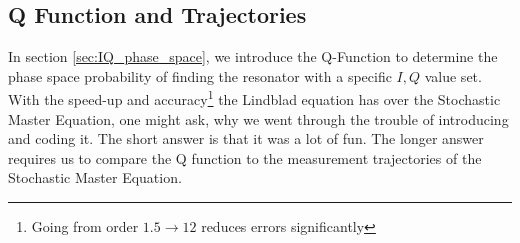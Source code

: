 

\FloatBarrier

\subsection{Q Function and Trajectories}
In section \ref{sec:IQ_phase_space}, we introduce the Q-Function to determine the phase space probability of finding the resonator with a specific $I, Q$ value set. With the speed-up and accuracy\footnote{Going from order $1.5 \rightarrow 12$ reduces errors significantly} the Lindblad equation has over the Stochastic Master Equation, one might ask, why we went through the trouble of introducing and coding it. The short answer is that it was a lot of fun. The longer answer requires us to compare the Q function to the measurement trajectories of the Stochastic Master Equation.


